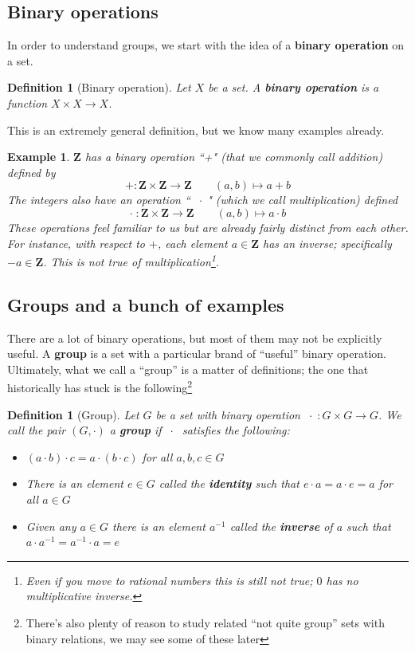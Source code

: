 \documentclass[12pt]{article}
\numberwithin{equation}{subsection}
\newtheorem{defn}[subsection]{Definition}
\theoremstyle{note}
\newtheorem{example}[subsection]{Example}
\begin{document}
\subsection{Binary operations}
In order to understand groups, we start with the idea of a \textbf{binary operation} on a set. 

\begin{defn}[Binary operation]
Let $X$ be a set. A \textbf{binary operation} is a function $X\times X\to X$. 
\end{defn}
This is an extremely general definition, but we know many examples already.
\begin{example}$\mathbf{Z}$ has a binary operation ``+" (that we commonly call addition) defined by \begin{equation} +\colon \mathbf{Z}\times \mathbf{Z}\to \mathbf{Z}\qquad (a,b)\mapsto a+b \end{equation}
The integers also have an operation `` $\;\cdot\;$" (which we call multiplication) defined \begin{equation} \cdot \;\colon \mathbf{Z}\times \mathbf{Z}\to \mathbf{Z}\qquad (a,b)\mapsto a\cdot b \end{equation}
These operations feel familiar to us but are already fairly distinct from each other. For instance, with respect to $+$, each element $a\in\mathbf{Z}$ has an inverse; specifically $-a\in\mathbf{Z}$. This is not true of multiplication\footnote{Even if you move to rational numbers this is still not true; $0$ has no multiplicative inverse.}. \end{example}



%


\subsection{Groups and a bunch of examples}

There are a lot of binary operations, but most of them may not be explicitly useful. A \textbf{group} is a set with a particular brand of ``useful'' binary operation. Ultimately, what we call a ``group'' is a matter of definitions; the one that historically has stuck is the following\footnote{There's also plenty of reason to study related ``not quite group'' sets with binary relations, we may see some of these later}

\begin{defn}[Group] \label{def-group}
	Let $G$ be a set with binary operation $\;\cdot\; \colon G\times G\to G$. We call the pair $(G,\cdot)$ a \textbf{group} if $\;\cdot\;$ satisfies the following:
	\begin{itemize}
		\item $(a\cdot b)\cdot c=a\cdot (b\cdot c)$ for all $a,b,c\in G$
		\item There is an element $e\in G$ called the \textbf{identity} such that $e\cdot a=a\cdot e=a$ for all $a\in G$
		\item Given any $a\in G$ there is an element $a^{-1}$ called the \textbf{inverse} of $a$ such that $a\cdot a^{-1}=a^{-1}\cdot a= e$
	\end{itemize}
\end{defn}
\end{document}

